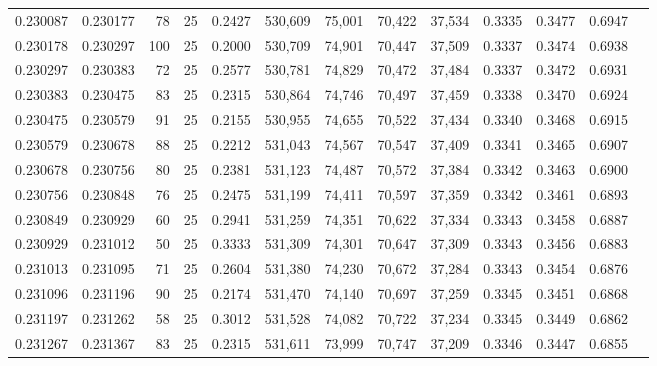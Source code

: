 \begin{tabular}{rrrrrrrrrrrrr}
0.230087 & 0.230177 &    78 &  25 &                                     0.2427 & 530,609 &  75,001 &  70,422 &  37,534 & 0.3335 & 0.3477 & 0.6947 \\
0.230178 & 0.230297 &   100 &  25 &                                     0.2000 & 530,709 &  74,901 &  70,447 &  37,509 & 0.3337 & 0.3474 & 0.6938 \\
0.230297 & 0.230383 &    72 &  25 &                                     0.2577 & 530,781 &  74,829 &  70,472 &  37,484 & 0.3337 & 0.3472 & 0.6931 \\
0.230383 & 0.230475 &    83 &  25 &                                     0.2315 & 530,864 &  74,746 &  70,497 &  37,459 & 0.3338 & 0.3470 & 0.6924 \\
0.230475 & 0.230579 &    91 &  25 &                                     0.2155 & 530,955 &  74,655 &  70,522 &  37,434 & 0.3340 & 0.3468 & 0.6915 \\
0.230579 & 0.230678 &    88 &  25 &                                     0.2212 & 531,043 &  74,567 &  70,547 &  37,409 & 0.3341 & 0.3465 & 0.6907 \\
0.230678 & 0.230756 &    80 &  25 &                                     0.2381 & 531,123 &  74,487 &  70,572 &  37,384 & 0.3342 & 0.3463 & 0.6900 \\
0.230756 & 0.230848 &    76 &  25 &                                     0.2475 & 531,199 &  74,411 &  70,597 &  37,359 & 0.3342 & 0.3461 & 0.6893 \\
0.230849 & 0.230929 &    60 &  25 &                                     0.2941 & 531,259 &  74,351 &  70,622 &  37,334 & 0.3343 & 0.3458 & 0.6887 \\
0.230929 & 0.231012 &    50 &  25 &                                     0.3333 & 531,309 &  74,301 &  70,647 &  37,309 & 0.3343 & 0.3456 & 0.6883 \\
0.231013 & 0.231095 &    71 &  25 &                                     0.2604 & 531,380 &  74,230 &  70,672 &  37,284 & 0.3343 & 0.3454 & 0.6876 \\
0.231096 & 0.231196 &    90 &  25 &                                     0.2174 & 531,470 &  74,140 &  70,697 &  37,259 & 0.3345 & 0.3451 & 0.6868 \\
0.231197 & 0.231262 &    58 &  25 &                                     0.3012 & 531,528 &  74,082 &  70,722 &  37,234 & 0.3345 & 0.3449 & 0.6862 \\
0.231267 & 0.231367 &    83 &  25 &                                     0.2315 & 531,611 &  73,999 &  70,747 &  37,209 & 0.3346 & 0.3447 & 0.6855 \\

\end{tabular}
